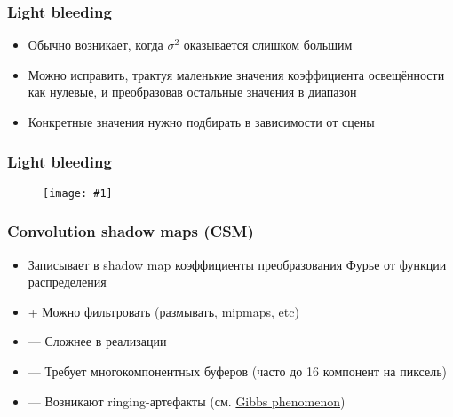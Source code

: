 \documentclass{beamer}
\newcommand{\slideimage}[1]{
  \begin{figure}
    \begin{adjustbox}{width=\textwidth, totalheight=\textheight-2\baselineskip-2\baselineskip,keepaspectratio}
      \texttt{[image: \#1]}
    \end{adjustbox}
  \end{figure}
}
\begin{document}
\begin{frame}[fragile]
\frametitle{Light bleeding}
\begin{itemize}
\item Обычно возникает, когда \begin{math}\sigma^2\end{math} оказывается слишком большим
\pause
\item Можно исправить, трактуя маленькие значения коэффициента освещённости как нулевые, и преобразовав остальные значения в диапазон \begin{math}[0, 1]\end{math}
\pause
\item Конкретные значения нужно подбирать в зависимости от сцены
\end{itemize}
\end{frame}

\begin{frame}[fragile]
\frametitle{Light bleeding}
\slideimage{light_bleeding_scheme.jpg}
\end{frame}

\begin{frame}[fragile]
\frametitle{Convolution shadow maps (CSM)}
\begin{itemize}
\item Записывает в shadow map коэффициенты преобразования Фурье от функции распределения
\pause
\item {\color{green}+} Можно фильтровать (размывать, mipmaps, etc)
\item {\color{red}—} Сложнее в реализации
\item {\color{red}—} Требует многокомпонентных буферов (часто до 16 компонент на пиксель)
\item {\color{red}—} Возникают ringing-артефакты (см. \href{https://en.wikipedia.org/wiki/Gibbs_phenomenon}{Gibbs phenomenon})
\end{itemize}
\end{frame}
\end{document}
